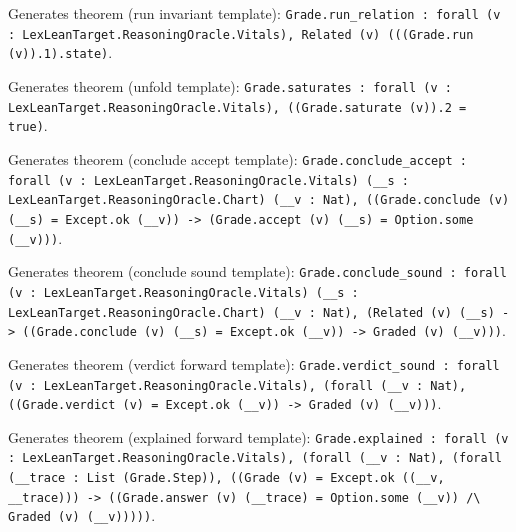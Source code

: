 \documentclass[11pt]{article}
\begin{document}
\noindent Generates theorem (run invariant template): \texttt{Grade.run\_relation : forall (v : LexLeanTarget.ReasoningOracle.Vitals), Related (v) (((Grade.run (v)).1).state)}.\par
\noindent Generates theorem (unfold template): \texttt{Grade.saturates : forall (v : LexLeanTarget.ReasoningOracle.Vitals), ((Grade.saturate (v)).2 = true)}.\par
\noindent Generates theorem (conclude accept template): \texttt{Grade.conclude\_accept : forall (v : LexLeanTarget.ReasoningOracle.Vitals) (\_\_s : LexLeanTarget.ReasoningOracle.Chart) (\_\_v : Nat), ((Grade.conclude (v) (\_\_s) = Except.ok (\_\_v)) -> (Grade.accept (v) (\_\_s) = Option.some (\_\_v)))}.\par
\noindent Generates theorem (conclude sound template): \texttt{Grade.conclude\_sound : forall (v : LexLeanTarget.ReasoningOracle.Vitals) (\_\_s : LexLeanTarget.ReasoningOracle.Chart) (\_\_v : Nat), (Related (v) (\_\_s) -> ((Grade.conclude (v) (\_\_s) = Except.ok (\_\_v)) -> Graded (v) (\_\_v)))}.\par
\noindent Generates theorem (verdict forward template): \texttt{Grade.verdict\_sound : forall (v : LexLeanTarget.ReasoningOracle.Vitals), (forall (\_\_v : Nat), ((Grade.verdict (v) = Except.ok (\_\_v)) -> Graded (v) (\_\_v)))}.\par
\noindent Generates theorem (explained forward template): \texttt{Grade.explained : forall (v : LexLeanTarget.ReasoningOracle.Vitals), (forall (\_\_v : Nat), (forall (\_\_trace : List (Grade.Step)), ((Grade (v) = Except.ok ((\_\_v, \_\_trace))) -> ((Grade.answer (v) (\_\_trace) = Option.some (\_\_v)) /\textbackslash{} Graded (v) (\_\_v)))))}.\par
\end{document}
